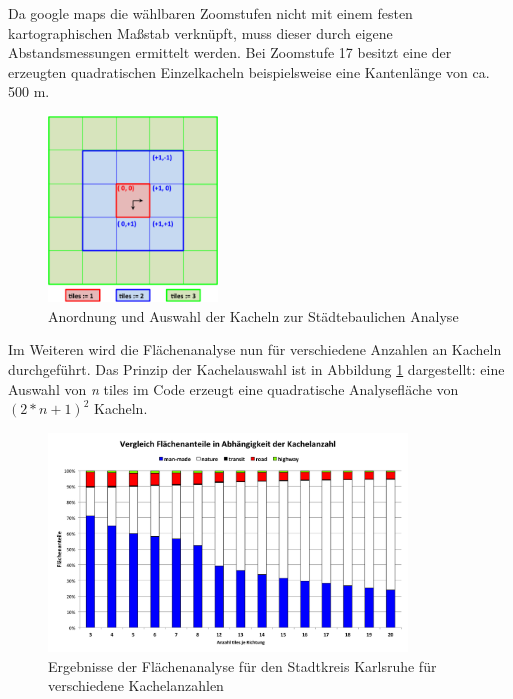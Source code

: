\documentclass[12pt,a4paper]{scrartcl}
\begin{document}
\newline
Da google maps die wählbaren Zoomstufen nicht mit einem festen kartographischen Maßstab verknüpft, muss dieser durch eigene Abstandsmessungen ermittelt werden. Bei Zoomstufe 17 besitzt eine der erzeugten quadratischen Einzelkacheln beispielsweise eine Kantenlänge von ca. \num{500} \si{\metre}.\\
%
\begin{figure}
  \centering
    \includegraphics[width=0.4\textwidth]{Auswahl_tiles.png}
    \caption{Anordnung und Auswahl der Kacheln zur Städtebaulichen Analyse}
    \label{fig:Auswahl_tiles}
\end{figure}
%
Im Weiteren wird die Flächenanalyse nun für verschiedene Anzahlen an Kacheln durchgeführt. Das Prinzip der Kachelauswahl ist in Abbildung \ref{fig:Auswahl_tiles} dargestellt: eine Auswahl von \textit{n} tiles im Code erzeugt eine quadratische Analysefläche von \((2*n+1)^2\) Kacheln.\\
%
\newline
\begin{figure}
  \centering
    \includegraphics[width=0.85\textwidth]{Kachelvergleich_KA.png}
    \caption{Ergebnisse der Flächenanalyse für den Stadtkreis Karlsruhe für verschiedene Kachelanzahlen}
    \label{fig:Kachel_vgl}
\end{figure}
\end{document}
